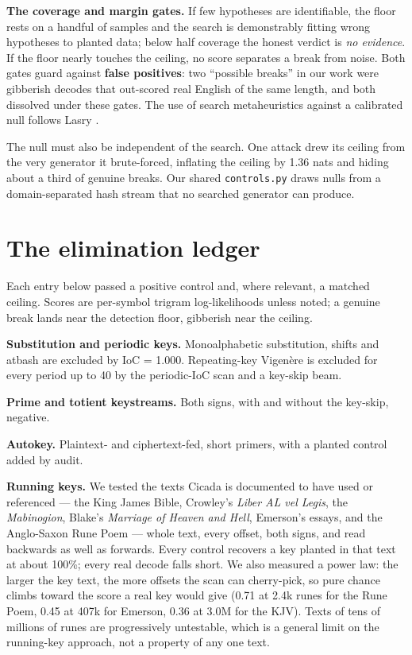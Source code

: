 \documentclass[11pt]{article}
\begin{document}
\textbf{The coverage and margin gates.} If few hypotheses are identifiable, the floor rests on a handful of samples and the search is demonstrably fitting wrong hypotheses to planted data; below half coverage the honest verdict is \emph{no evidence}. If the floor nearly touches the ceiling, no score separates a break from noise. Both gates guard against \textbf{false positives}: two ``possible breaks'' in our work were gibberish decodes that out-scored real English of the same length, and both dissolved under these gates. The use of search metaheuristics against a calibrated null follows Lasry \cite{lasry2018}.

The null must also be independent of the search. One attack drew its ceiling from the very generator it brute-forced, inflating the ceiling by 1.36 nats and hiding about a third of genuine breaks. Our shared \texttt{controls.py} draws nulls from a domain-separated hash stream that no searched generator can produce.

\section{The elimination ledger}

Each entry below passed a positive control and, where relevant, a matched ceiling. Scores are per-symbol trigram log-likelihoods unless noted; a genuine break lands near the detection floor, gibberish near the ceiling.

\textbf{Substitution and periodic keys.} Monoalphabetic substitution, shifts and atbash are excluded by IoC = 1.000. Repeating-key Vigenère is excluded for every period up to 40 by the periodic-IoC scan and a key-skip beam.

\textbf{Prime and totient keystreams.} Both signs, with and without the key-skip, negative.

\textbf{Autokey.} Plaintext- and ciphertext-fed, short primers, with a planted control added by audit.

\textbf{Running keys.} We tested the texts Cicada is documented to have used or referenced --- the King James Bible, Crowley's \emph{Liber AL vel Legis}, the \emph{Mabinogion}, Blake's \emph{Marriage of Heaven and Hell}, Emerson's essays, and the Anglo-Saxon Rune Poem --- whole text, every offset, both signs, and read backwards as well as forwards. Every control recovers a key planted in that text at about 100\%; every real decode falls short. We also measured a power law: the larger the key text, the more offsets the scan can cherry-pick, so pure chance climbs toward the score a real key would give (0.71 at 2.4k runes for the Rune Poem, 0.45 at 407k for Emerson, 0.36 at 3.0M for the KJV). Texts of tens of millions of runes are progressively untestable, which is a general limit on the running-key approach, not a property of any one text.
\end{document}
